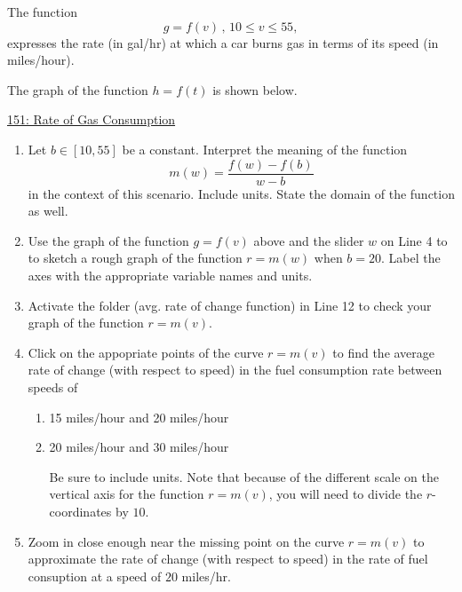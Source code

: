 \documentclass{ximera}
\begin{document}
\begin{question}  \label{Q4gdfetdsfsdfhfg4tr4}
The function
\[
      g = f(v)  \, , \, 10\leq v \leq 55 ,                     %
\]
expresses the rate (in gal/hr) at which a car burns gas in terms of its speed (in miles/hour).

The graph of the function $h=f(t)$ is shown below.

\begin{onlineOnly}
    \begin{center}
\end{center}
\end{onlineOnly}

\href{https://www.desmos.com/calculator/3ubcc1x8kh}{151: Rate of Gas Consumption}

\begin{enumerate}

\item Let $b\in [10,55]$ be a constant. Interpret the meaning of the function
\[
   m(w) =  \frac{f(w)-f(b)}{w-b}
\]
in the context of this scenario. Include units. State the domain of the function as well.

\item Use the graph of the function $g=f(v)$ above and the slider $w$ on Line 4 to to sketch a rough graph of the function $r=m(w)$ when $b=20$. Label the axes with the appropriate variable names and units.

\item Activate the folder (avg. rate of change function) in Line 12 to check your graph of the function $r=m(v)$. 

\item Click on the appopriate points of the curve $r=m(v)$ to find the average rate of change (with respect to speed) in the fuel consumption rate between speeds of  

\begin{enumerate}
\item 15 miles/hour and 20 miles/hour

\item 20 miles/hour and 30 miles/hour

Be sure to include units. Note that because of the different  scale on the vertical axis for the function $r=m(v)$, you will need to divide the $r$-coordinates by $10$.

\end{enumerate}

\item Zoom in close enough near the missing point on the curve $r=m(v)$ to approximate the rate of change (with respect to speed) in the rate of fuel consuption at a speed of $20$ miles/hr.


\end{enumerate}
\end{question}
\end{document}
